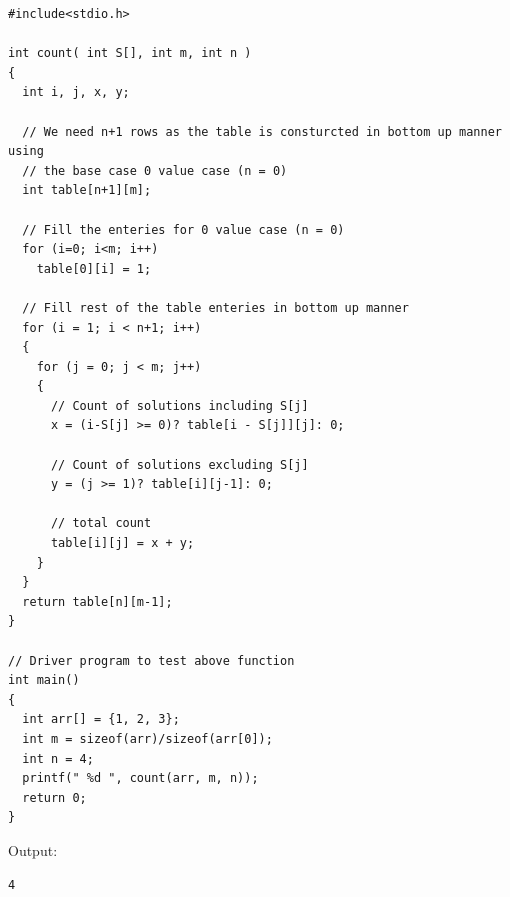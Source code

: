 \begin{lstlisting}[style=raycppnewsnippet]
#include<stdio.h>
 
int count( int S[], int m, int n )
{
  int i, j, x, y;
 
  // We need n+1 rows as the table is consturcted in bottom up manner using 
  // the base case 0 value case (n = 0)
  int table[n+1][m];
  
  // Fill the enteries for 0 value case (n = 0)
  for (i=0; i<m; i++)
    table[0][i] = 1;
 
  // Fill rest of the table enteries in bottom up manner  
  for (i = 1; i < n+1; i++)
  {
    for (j = 0; j < m; j++)
    {
      // Count of solutions including S[j]
      x = (i-S[j] >= 0)? table[i - S[j]][j]: 0;
 
      // Count of solutions excluding S[j]
      y = (j >= 1)? table[i][j-1]: 0;
 
      // total count
      table[i][j] = x + y;
    }
  }
  return table[n][m-1];
}

// Driver program to test above function
int main()
{
  int arr[] = {1, 2, 3};
  int m = sizeof(arr)/sizeof(arr[0]);
  int n = 4;
  printf(" %d ", count(arr, m, n));
  return 0;
}
\end{lstlisting}
Output:
\begin{lstlisting}[style=raygeneric]
4
\end{lstlisting}

\RayNotesBegin

